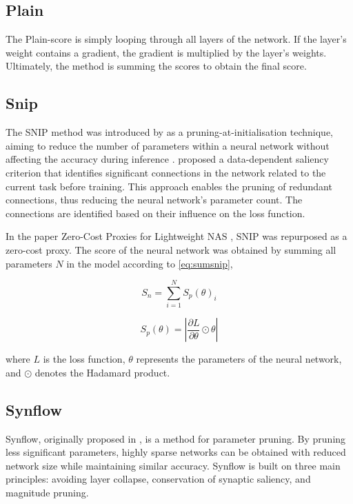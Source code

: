 \subsection{Plain}
The Plain-score is simply looping through all layers of the network. If the layer's weight contains a gradient, the gradient is multiplied by the layer's weights. Ultimately, the method is summing the scores to obtain the final score. 

\subsection{Snip}
The \gls{SNIP} method was introduced by \autocite{lee2018snip} as a pruning-at-initialisation technique, aiming to reduce the number of parameters within a neural network without affecting the accuracy during inference \autocite{frankle2020pruning}. \cite{frankle2020pruning} proposed a data-dependent saliency criterion that identifies significant connections in the network related to the current task before training. This approach enables the pruning of redundant connections, thus reducing the neural network's parameter count. The connections are identified based on their influence on the loss function.

\noindent In the paper Zero-Cost Proxies for Lightweight \gls{NAS} \autocite{abdelfattah2021zero}, \gls{SNIP} was repurposed as a zero-cost proxy. The score of the neural network was obtained by summing all parameters $N$ in the model according to \cref{eq:sumsnip},

\begin{equation}\label{eq:sumsnip}
S_n = \sum_{i=1}^N S_p(\theta)_i
\end{equation}

\begin{equation}
S_p(\theta) = \left|\frac{\partial L}{\partial \theta} \odot \theta\right|
\end{equation}

where $L$ is the loss function, \(\theta \) represents the parameters of the neural network, and \(\odot\) denotes the Hadamard product.



\subsection{Synflow}
\gls{Synflow}, originally proposed in \autocite{tanaka2020pruning}, is a method for parameter pruning. By pruning less significant parameters, highly sparse networks can be obtained with reduced network size while maintaining similar accuracy. \gls{Synflow} is built on three main principles: avoiding layer collapse, conservation of synaptic saliency, and magnitude pruning.

